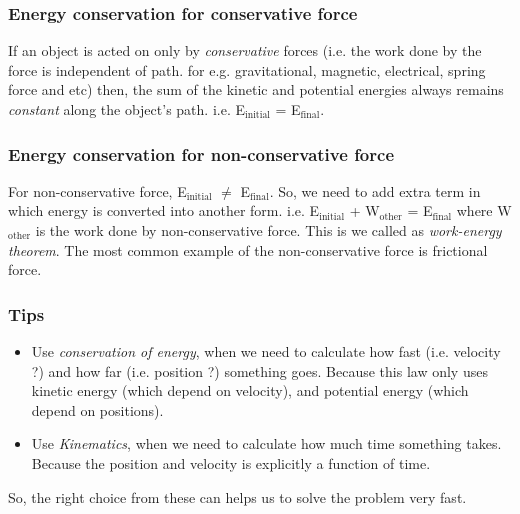 \documentclass[12pt,a4paper]{article}
\begin{document}
\subsubsection{Energy conservation for conservative force}

If an object is acted on only by \emph{conservative} forces (i.e. the work done by the force is independent of path. for e.g. gravitational, magnetic, electrical, spring force and etc) then, the sum of the kinetic and potential energies always remains \emph{constant} along the object's path. i.e. E$_\text{initial}$ = E$_\text{final}$.

\subsubsection{Energy conservation for non-conservative force}

For non-conservative force, E$_\text{initial}$ $\neq$ E$_\text{final}$. So, we need to add extra term in which energy is converted into another form. i.e. E$_\text{initial}$ + W$_\text{other}$ = E$_\text{final}$ where W$_\text{other}$ is the work done by non-conservative force. This is we called as \emph{work-energy theorem}. The most common example of the non-conservative force is frictional force.

\subsubsection*{Tips}
\begin{itemize}
\item Use \emph{conservation of energy}, when we need to calculate how fast (i.e. velocity ?) and how far (i.e. position ?) something goes. Because this law only uses kinetic energy (which depend on velocity), and potential energy (which depend on positions).
\item Use \emph{Kinematics}, when we need to calculate how much time something takes. Because the position and velocity is explicitly a function of time.
\end{itemize}
So, the right choice from these can helps us to solve the problem very fast.
\end{document}
